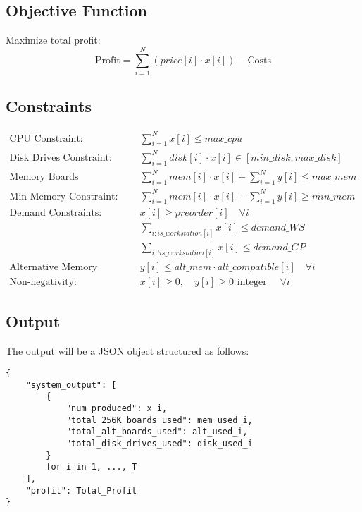 \documentclass{article}
\begin{document}
\subsection*{Objective Function}
Maximize total profit:
\[
\text{Profit} = \sum_{i=1}^{N} (price[i] \cdot x[i]) - \text{Costs}
\]

\subsection*{Constraints}
\begin{align*}
    \text{CPU Constraint:} & \quad \sum_{i=1}^{N} x[i] \leq max\_cpu \\
    \text{Disk Drives Constraint:} & \quad \sum_{i=1}^{N} disk[i] \cdot x[i] \in [min\_disk, max\_disk] \\
    \text{Memory Boards Constraint:} & \quad \sum_{i=1}^{N} mem[i] \cdot x[i] + \sum_{i=1}^{N} y[i] \leq max\_mem \\
    \text{Min Memory Constraint:} & \quad \sum_{i=1}^{N} mem[i] \cdot x[i] + \sum_{i=1}^{N} y[i] \geq min\_mem \\
    \text{Demand Constraints:} & \quad x[i] \geq preorder[i] \quad \forall i \\
    & \quad \sum_{i : is\_workstation[i]} x[i] \leq demand\_WS \\
    & \quad \sum_{i : !is\_workstation[i]} x[i] \leq demand\_GP \\
    \text{Alternative Memory Usage:} & \quad y[i] \leq alt\_mem \cdot alt\_compatible[i] \quad \forall i \\
    \text{Non-negativity:} & \quad x[i] \geq 0, \quad y[i] \geq 0 \text{ integer } \quad \forall i
\end{align*}

\subsection*{Output}
The output will be a JSON object structured as follows:
\begin{verbatim}
{
    "system_output": [
        {
            "num_produced": x_i,
            "total_256K_boards_used": mem_used_i,
            "total_alt_boards_used": alt_used_i,
            "total_disk_drives_used": disk_used_i
        }
        for i in 1, ..., T
    ],
    "profit": Total_Profit
}
\end{verbatim}
\end{document}
